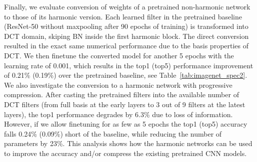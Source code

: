\documentclass[12pt,a4paper]{article}
\begin{document}
Finally, we evaluate conversion of weights of a pretrained non-harmonic network to those of its harmonic version. Each learned filter in the pretrained baseline (ResNet-50 without maxpooling after 90 epochs of training) is transformed into DCT domain, skiping BN inside the first harmonic block. The direct conversion resulted in the exact same numerical performance due to the basis properties of DCT.
We then finetune the converted model for another 5 epochs with the learning rate of 0.001, which results in the top1 (top5) performance improvement of 0.21\% (0.19\%) over the pretrained baseline, see Table~\ref{tab:imagenet_spec2}. We also investigate the conversion to a harmonic network with progressive  compression. After casting the pretrained filters into the available number of DCT filters (from full basis at the early layers to 3 out of 9 filters at the latest layers), the top1 performance degrades by 6.3\% due to loss of information. However, if we allow finetuning for as few as 5 epochs the top1 (top5) accuracy falls 0.24\% (0.09\%) short of the baseline, while reducing the number of parameters by 23\%. This analysis shows how the harmonic networks can be used to improve the accuracy and/or compress the existing pretrained CNN models.
\end{document}
